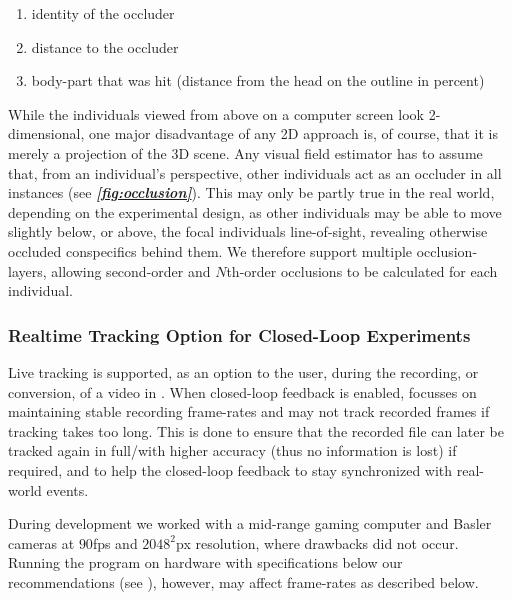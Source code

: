 \documentclass[9pt,lineno]{elife}
\newcommand{\figref}[1]{\textit{\textbf{\ref{#1}}}}
\newcommand{\TGrabs}{\protect\path{TGrabs}}
\begin{document}
\begin{enumerate}
	\item identity of the occluder
	\item distance to the occluder
	\item body-part that was hit (distance from the head on the outline in percent)
\end{enumerate}

While the individuals viewed from above on a computer screen look 2-dimensional, one major disadvantage of any 2D approach is, of course, that it is merely a projection of the 3D scene. Any visual field estimator has to assume that, from an individual's perspective, other individuals act as an occluder in all instances (see \figref{fig:occlusion}). This may only be partly true in the real world, depending on the experimental design, as other individuals may be able to move slightly below, or above, the focal individuals line-of-sight, revealing otherwise occluded conspecifics behind them. We therefore support multiple occlusion-layers, allowing second-order and $N$th-order occlusions to be calculated for each individual. %


\subsubsection{Realtime Tracking Option for Closed-Loop Experiments}

Live tracking is supported, as an option to the user, during the recording, or conversion, of a video in \TGrabs{}. When closed-loop feedback is enabled, \TGrabs{} focusses on maintaining stable recording frame-rates and may not track recorded frames if tracking takes too long. This is done to ensure that the recorded file can later be tracked again in full/with higher accuracy (thus no information is lost) if required, and to help the closed-loop feedback to stay synchronized with real-world events.

During development we worked with a mid-range gaming computer and Basler cameras at $90$fps and $2048^2$px resolution, where drawbacks did not occur. {\color{blue} Running the program on hardware with specifications below our recommendations (see ), however, may affect frame-rates as described below.}
\end{document}
